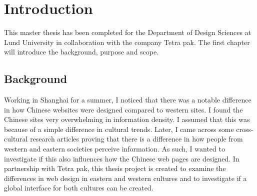 
\chapter{Introduction} %

\label{Introduction} %


\newcommand{\keyword}[1]{\textbf{#1}}
\newcommand{\tabhead}[1]{\textbf{#1}}
\newcommand{\code}[1]{\texttt{#1}}
\newcommand{\file}[1]{\texttt{\bfseries#1}}
\newcommand{\option}[1]{\texttt{\itshape#1}}



This master thesis has been completed for the Department of Design Sciences at Lund University in collaboration with the company Tetra pak. The first chapter will introduce the background, purpose and scope.

\section{Background}
Working in Shanghai for a summer, I noticed that there was a notable difference in how Chinese websites were designed compared to western sites. I found the Chinese sites very overwhelming in information density. I assumed that this was because of a simple difference in cultural trends. Later, I came across some cross-cultural research articles proving that there is a difference in how people from western and eastern societies perceive information. As such, I wanted to investigate if this also influences how the Chinese web pages are designed. In partnership with Tetra pak, this thesis project is created to examine the differences in web design in eastern and western cultures and to investigate if a global interface for both cultures can be created.


